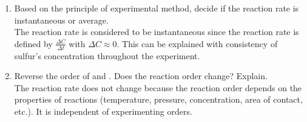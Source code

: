 \begin{enumerate}
	\item Based on the principle of experimental method, decide if the reaction rate is instantaneous or average.\\
	The reaction rate is considered to be instantaneous since the reaction rate is defined by $\frac{\Delta C}{\Delta t}$ with $\Delta C \approx 0$. This can be explained with consistency of sulfur's concentration throughout the experiment.
	
	\item Reverse the order of  and . Does the reaction order change? Explain.\\
	The reaction rate does not change because the reaction order depends on the properties of reactions (temperature, pressure, concentration, area of contact, etc.). It is independent of experimenting orders.
\end{enumerate}